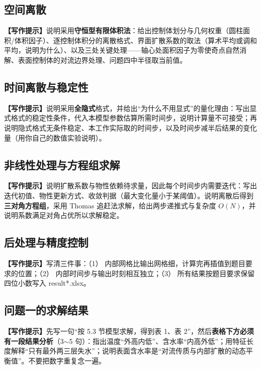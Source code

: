 \documentclass[12pt,a4paper]{article}
\newcommand{\prompt}[1]{\par\noindent\textbf{【写作提示】}#1\par}      %
\begin{document}
\subsection{空间离散}

\prompt{说明采用\textbf{守恒型有限体积法}：给出控制体划分与几何权重（圆柱面积/体积因子）、逐控制体积分的离散格式、界面扩散系数的取法（算术平均或调和平均，说明为什么）、以及三处关键处理——轴心处面积因子为零使奇点自然消解、表面控制体的对流边界处理、问题四中半径取当前值。}

\subsection{时间离散与稳定性}

\prompt{说明采用\textbf{全隐式}格式，并给出“为什么不用显式”的量化理由：写出显式格式的稳定性条件，代入本模型参数估算所需时间步，说明计算量不可接受；再说明隐式格式无条件稳定、本工作实际取的时间步，以及时间步减半后结果的变化量（用你自己的数值实验说明）。}

\subsection{非线性处理与方程组求解}

\prompt{说明扩散系数与物性依赖待求量，因此每个时间步内需要迭代：写出迭代初值、物性更新方式、收敛判据（最大变化量小于某阈值）。说明离散后得到\textbf{三对角方程组}，采用 Thomas 追赶法求解，给出两步递推式与复杂度 $O(N)$，并说明系数满足对角占优所以求解稳定。}

\subsection{后处理与精度控制}

\prompt{写清三件事：（1） 内部网格比输出网格细，计算完再插值到题目要求的位置；（2） 内部时间步与输出时刻相互独立；（3） 所有结果按题目要求保留四位小数写入 result*.xlsx。}

\subsection{问题一的求解结果}

\prompt{先写一句“按 5.3 节模型求解，得到表 1、表 2”，然后\textbf{表格下方必须有一段结果分析}（3$\sim$5 句）：指出温度“外高内低”、含水率“内高外低”；用特征长度解释“只有最外两三层失水”；说明表面含水率是“对流传质与内部扩散的动态平衡值”。不要把数字重复念一遍。}
\end{document}
